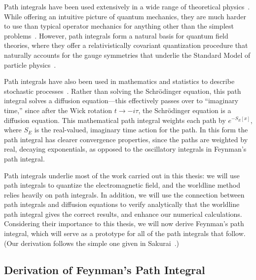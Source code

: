     Path integrals have been used extensively in a wide range of theoretical physics~\cite{Kleinert2012}.
    While offering an intuitive picture of quantum mechanics, they are much harder to use 
    than typical operator mechanics for anything other than the simplest problems~\cite{Feynman1965}.
    However, path integrals form a natural basis for quantum field theories, where they offer a relativistically covariant
    quantization procedure that naturally accounts for the gauge symmetries 
    that underlie the Standard Model of particle physics~\cite{Brown1994,Srednicki2008}.

    Path integrals have also been used in mathematics and statistics to describe stochastic 
    processes~\cite{Kac1949,Durrett1996, Karatzas1991}.  Rather than solving the Schr\"odinger equation, 
    this path integral solves a diffusion equation---this effectively passes over to ``imaginary time,''
    since after the Wick rotation $t\rightarrow -i \tau$, the Schr\"odinger equation is a diffusion equation.
    This mathematical path integral weights each path by $e^{-S_{E}[x]}$, where $S_E$ is the real-valued, imaginary time action for the path.
    In this form the path integral has clearer convergence properties, 
    since the paths are weighted by real, decaying exponentials, as opposed to the oscillatory integrals
    in Feynman's path integral.  

        
    Path integrals underlie most of the work carried out in this thesis: we will use path integrals
    to quantize the electromagnetic field, and the worldline method relies heavily on path integrals.
    In addition, we will use the connection between path integrals and diffusion equations
    to verify analytically that the worldline path integral gives the correct results, and enhance our numerical
    calculations.  Considering their importance to this thesis, we will 
    now derive Feynman's path integral, which will serve as a prototype for all of the path integrals
    that follow.  (Our derivation follows the simple one given in Sakurai~\cite{Sakurai1994}.)

    \subsection{Derivation of Feynman's Path Integral}

